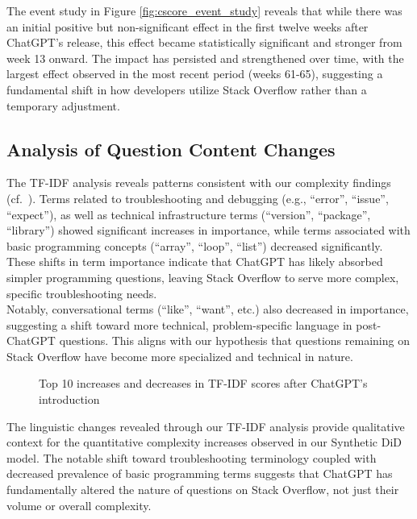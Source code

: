 The event study in Figure \ref{fig:cscore_event_study} reveals that while there was an initial positive but non-significant effect in the first twelve weeks after ChatGPT's release, this effect became statistically significant and stronger from week 13 onward. The impact has persisted and strengthened over time, with the largest effect observed in the most recent period (weeks 61-65), suggesting a fundamental shift in how developers utilize Stack Overflow rather than a temporary adjustment.


\subsection{Analysis of Question Content Changes}

The TF-IDF analysis reveals patterns consistent with our complexity findings (cf.~). Terms related to troubleshooting and debugging (e.g., \enquote{error}, \enquote{issue}, \enquote{expect}), as well as technical infrastructure terms (\enquote{version}, \enquote{package}, \enquote{library}) showed significant increases in importance, while terms associated with basic programming concepts (\enquote{array}, \enquote{loop}, \enquote{list}) decreased significantly. These shifts in term importance indicate that ChatGPT has likely absorbed simpler programming questions, leaving Stack Overflow to serve more complex, specific troubleshooting needs.\\

Notably, conversational terms (\enquote{like}, \enquote{want}, etc.) also decreased in importance, suggesting a shift toward more technical, problem-specific language in post-ChatGPT questions. This aligns with our hypothesis that questions remaining on Stack Overflow have become more specialized and technical in nature.

\begin{figure}[H]
    \centering
    
    \caption{Top 10 increases and decreases in TF-IDF scores after ChatGPT's introduction}
    \label{fig:tfidf}
\end{figure}

The linguistic changes revealed through our TF-IDF analysis provide qualitative context for the quantitative complexity increases observed in our Synthetic DiD model. The notable shift toward troubleshooting terminology coupled with decreased prevalence of basic programming terms suggests that ChatGPT has fundamentally altered the nature of questions on Stack Overflow, not just their volume or overall complexity.

